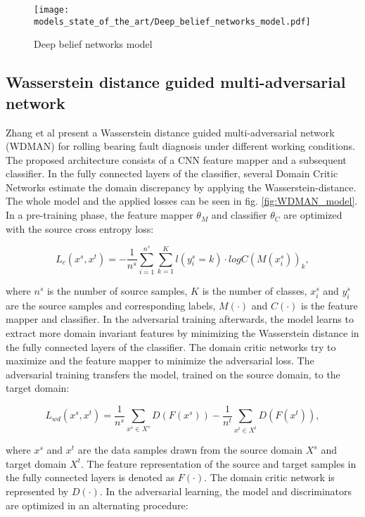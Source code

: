 {\begin{figure}[H]
  \centering
  \texttt{[image: models\_state\_of\_the\_art/Deep\_belief\_networks\_model.pdf]}
  \caption{Deep belief networks model \cite{Zhang2017}}
  \label{fig:Deep_belief_networks_model}
\end{figure}


\subsection{Wasserstein distance guided multi-adversarial network}
Zhang et al \cite{Zhang2019} present a Wasserstein distance guided multi-adversarial network (WDMAN) for rolling bearing fault diagnosis under different working conditions. The proposed architecture consists of a CNN feature mapper and a subsequent classifier. In the fully connected layers of the classifier, several Domain Critic Networks estimate the domain discrepancy by applying the Wasserstein-distance. The whole model and the applied losses can be seen in fig. \ref{fig:WDMAN_model}. In a pre-training phase, the feature mapper $\theta_{M}$ and classifier $\theta_{C}$ are optimized with the source cross entropy loss:
 
\begin{equation}
     L_{c}(x^{s}, x^{t}) = -\frac{1}{n^{s}} \sum_{i=1}^{n^{s}} \sum_{k=1}^{K} l(y_{i}^{s}=k) \cdot logC(M(x_{i}^{s}))_{k},
\end{equation}

where $n^{s}$ is the number of source samples, $K$ is the number of classes, $x_{i}^{s}$ and $y_{i}^{s}$ are the source samples and corresponding labels, $M(\cdot)$ and $C(\cdot)$ is the feature mapper and classifier. In the adversarial training afterwards, the model learns to extract more domain invariant features by minimizing the Wasserstein distance in the fully connected layers of the classifier. The domain critic networks try to maximize and the feature mapper to minimize the adversarial loss. The adversarial training transfers the model, trained on the source domain, to the target domain:
 
\begin{equation}
     L_{wd}(x^{s}, x^{t}) = \frac{1}{n^{s}} \sum_{x^{s} \in X^{s}} D(F(x^{s})) - \frac{1}{n^{t}} \sum_{x^{t} \in X^{t}} D(F(x^{t})),
\end{equation}

where $x^{s}$ and $x^{t}$ are the data samples drawn from the source domain $X^{s}$ and target domain $X^{t}$. The feature representation of the source and target samples in the fully connected layers is denoted as $F(\cdot)$. The domain critic network is represented by $D(\cdot)$. In the adversarial learning, the model and discriminators are optimized in an alternating procedure:

}
